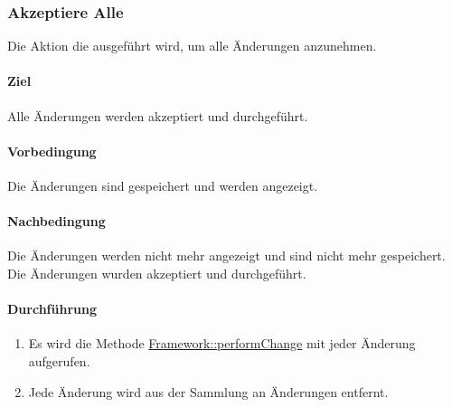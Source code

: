 \newpage
\subsubsection{Akzeptiere Alle}\label{AP_Aktionen_Anderungen_Akzeptiere_Alle}

Die Aktion die ausgeführt wird, um alle Änderungen anzunehmen.

\paragraph*{Ziel}
Alle Änderungen werden akzeptiert und durchgeführt.

\paragraph*{Vorbedingung}
Die Änderungen sind gespeichert und werden angezeigt.

\paragraph*{Nachbedingung}
Die Änderungen werden nicht mehr angezeigt und sind nicht mehr gespeichert. Die Änderungen wurden akzeptiert und durchgeführt.

\paragraph*{Durchführung}
\begin{enumerate}
    \item Es wird die Methode \hyperref[AP_Framework_performChange]{Framework::performChange} mit jeder Änderung aufgerufen.
    \item Jede Änderung wird aus der Sammlung an Änderungen entfernt.
\end{enumerate}